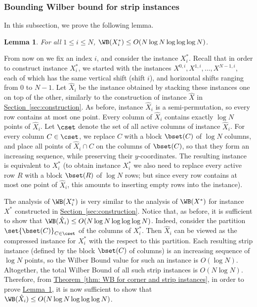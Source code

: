 \documentclass[11pt]{article}
\numberwithin{equation}{section}
\newtheorem{lemma}[theorem]{Lemma}
\theoremstyle{definition}
\theoremstyle{plain}
\newcommand{\expref}[2]{\hyperref[#2]{#1~\ref{#2}}}
\begin{document}
\subsubsection{Bounding Wilber bound for strip instances}
In this subsection, we prove the following lemma.

\begin{lemma}\label{lem: bounding vertical WB for strip}
	For all $1\leq i\leq N$, $\WB(X^*_i)\leq O(N\log N\log\log\log N)$.
\end{lemma}

From now on we fix an index $i$, and consider the instance $X^*_i$. 
Recall that in order to construct instance $X^*_i$, we started with the instances $X^{0,i},X^{1,i},\ldots,X^{N-1,i}$, each of which has the same vertical shift (shift $i$), and horizontal shifts ranging from $0$ to $N-1$. Let $\hat X_i$ be the instance obtained by stacking these instances one on top of the other, similarly to the construction of instance $\hat X$ in \expref{Section}{sec:construction}. As before, instance $\hat X_i$ is a semi-permutation, so every row contains at most one point. Every column of $\hat X_i$ contains exactly $\log N$ points of $\hat X_i$. Let $\cset$ denote the set of all active columns of instance $\hat X_i$. For every column $C\in \cset$, we replace $C$ with a block $\bset(C)$ of $\log N$ columns, and place all points of $\hat X_i\cap C$ on the columns of $\bset(C)$, so that they form an increasing sequence, while preserving their $y$-coordinates. The resulting instance is equivalent to $X^*_i$ (to obtain instance $X^*_i$ we also need to replace every active row $R$ with a block $\bset(R)$ of $\log N$ rows; but since every row contains at most one point of $\hat X_i$, this amounts to inserting empty rows into the instance).

The analysis of $\WB(X^*_i)$ is very similar to the analysis of $\WB(X^*)$ for instance $X^*$ constructed in \expref{Section}{sec:construction}. Notice that, as before, it is sufficient to show that $\WB(\hat X_i)\leq  O(N\log N\log\log\log N)$.
Indeed, consider the partition $\set{\bset(C)}_{C\in \cset}$ of the columns of $X^*_i$. Then $\hat X_i$ can be viewed as the compressed instance for $X^*_i$ with the respect to this partition. Each resulting strip instance (defined by the block $\bset(C)$ of columns) is an increasing sequence of $\log N$ points, so the Wilber Bound value for such an instance is $O(\log N)$. Altogether, the total Wilber Bound of all such strip instances is $O(N\log N)$. Therefore, from \expref{Theorem}{thm: WB for corner and strip instances}, in order to prove \expref{Lemma}{lem: bounding vertical WB for strip}, it is now sufficient to show that $\WB(\hat X_i)\leq O(N\log N\log\log\log N)$.
\end{document}
